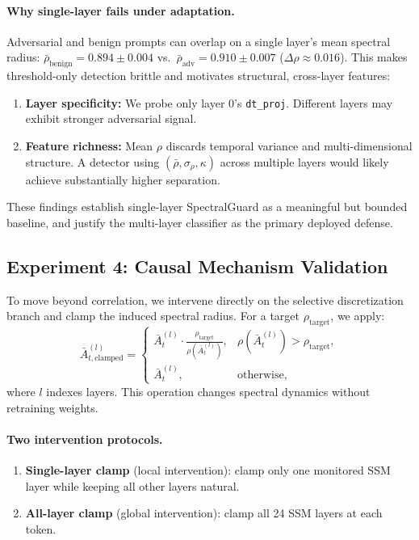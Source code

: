 \documentclass[10pt,twocolumn]{article}
\begin{document}
\paragraph{Why single-layer fails under adaptation.}
Adversarial and benign prompts can overlap on a single layer's mean spectral radius: $\bar{\rho}_{\text{benign}}=0.894 \pm 0.004$ vs.~$\bar{\rho}_{\text{adv}}=0.910 \pm 0.007$ ($\Delta\rho \approx 0.016$). This makes threshold-only detection brittle and motivates structural, cross-layer features:
\begin{enumerate}
\item \textbf{Layer specificity:} We probe only layer 0's \texttt{dt\_proj}. Different layers may exhibit stronger adversarial signal.
\item \textbf{Feature richness:} Mean $\rho$ discards temporal variance and multi-dimensional structure. A detector using $(\bar{\rho}, \sigma_\rho, \kappa)$ across multiple layers would likely achieve substantially higher separation.
\end{enumerate}
These findings establish single-layer SpectralGuard as a meaningful but bounded baseline, and justify the multi-layer classifier as the primary deployed defense.

\subsection{Experiment 4: Causal Mechanism Validation} %
\label{sec:causal_validation_results}
\label{sec:exp4} %

To move beyond correlation, we intervene directly on the selective discretization branch and clamp the induced spectral radius. For a target $\rho_{\text{target}}$, we apply:
\begin{equation}
\bar{A}^{(l)}_{t,\text{clamped}} =
\begin{cases}
\bar{A}^{(l)}_t \cdot \frac{\rho_{\text{target}}}{\rho(\bar{A}^{(l)}_t)}, & \rho(\bar{A}^{(l)}_t) > \rho_{\text{target}}, \\
\bar{A}^{(l)}_t, & \text{otherwise},
\end{cases}
\label{eq:causal_clamp}
\end{equation}
where $l$ indexes layers. This operation changes spectral dynamics without retraining weights.

\paragraph{Two intervention protocols.}
\begin{enumerate}
\item \textbf{Single-layer clamp} (local intervention): clamp only one monitored SSM layer while keeping all other layers natural.
\item \textbf{All-layer clamp} (global intervention): clamp all 24 SSM layers at each token.
\end{enumerate}
\end{document}
